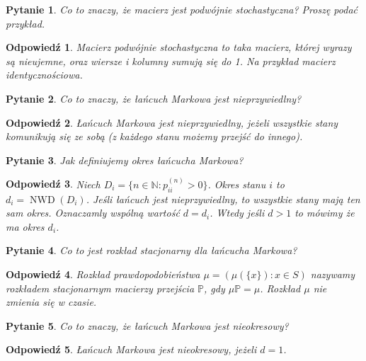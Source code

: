 \documentclass[12pt]{mwart}
\theoremstyle{plain}
\newtheorem{pytanie}{Pytanie}
\theoremstyle{break}
\newtheorem*{odpowiedź}{Odpowiedź}
\begin{document}
\begin{pytanie}
Co to znaczy, że macierz jest podwójnie stochastyczna? Proszę podać przykład.
\end{pytanie}
\begin{odpowiedź}
    Macierz podwójnie stochastyczna to taka macierz,
    której wyrazy są nieujemne, oraz
    wiersze i kolumny sumują się do 1.
    Na przykład macierz identycznościowa.
\end{odpowiedź}


\begin{pytanie}
Co to znaczy, że łańcuch Markowa jest nieprzywiedlny?
\end{pytanie}
\begin{odpowiedź}
    Łańcuch Markowa jest nieprzywiedlny, jeżeli wszystkie
    stany komunikują się ze sobą (z każdego stanu
    możemy przejść do innego).
\end{odpowiedź}


\begin{pytanie}
Jak definiujemy okres łańcucha Markowa?
\end{pytanie}
\begin{odpowiedź}
    Niech $D_i = \{n \in \mathbb{N}: p_{ii}^{(n)} > 0 \}$.
    Okres stanu $i$ to $d_i=\operatorname{NWD}(D_i)$.
    Jeśli łańcuch jest nieprzywiedlny, to wszystkie stany mają ten
    sam okres. Oznaczamly wspólną wartość $d = d_i$.
    Wtedy jeśli $d > 1$ to mówimy że ma okres $d_i$.
\end{odpowiedź}


\begin{pytanie}
Co to jest rozkład stacjonarny dla łańcucha Markowa?
\end{pytanie}
\begin{odpowiedź}
    Rozkład prawdopodobieństwa $\mu = (\mu (\{x\}) : x\in S)$
    nazywamy rozkładem stacjonarnym macierzy przejścia $\mathbb{P}$,
    gdy $\mu \mathbb{P} = \mu$.
    Rozkład $\mu$ nie zmienia się w czasie.
\end{odpowiedź}


\begin{pytanie}
Co to znaczy, że łańcuch Markowa jest nieokresowy?
\end{pytanie}
\begin{odpowiedź}
    Łańcuch Markowa jest nieokresowy, jeżeli $d=1$.
\end{odpowiedź}
\end{document}
